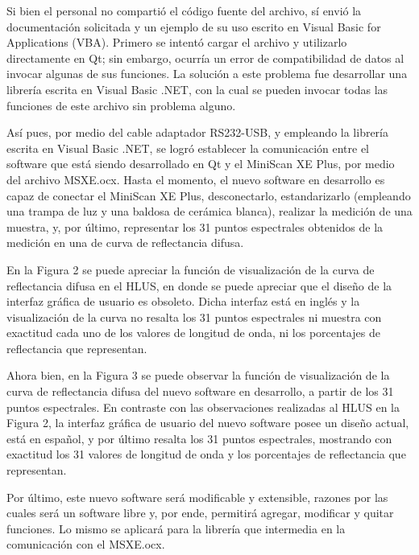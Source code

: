 \documentclass[conference]{IEEEtran}
\begin{document}
	Si bien el personal no comparti\'{o} el c\'{o}digo fuente del archivo, s\'{i} envi\'{o} la documentaci\'{o}n solicitada y un ejemplo de su uso escrito en Visual Basic for Applications (VBA). Primero se intent\'{o} cargar el archivo y utilizarlo directamente en Qt; sin embargo, ocurr\'{i}a un error de compatibilidad de datos al invocar algunas de sus funciones. La soluci\'{o}n a este problema fue desarrollar una librer\'{i}a escrita en Visual Basic .NET, con la cual se pueden invocar todas las funciones de este archivo sin problema alguno.

	As\'{i} pues, por medio del cable adaptador RS232-USB, y empleando la librer\'{i}a escrita en Visual Basic .NET, se logr\'{o} establecer la comunicaci\'{o}n entre el software que est\'{a} siendo desarrollado en Qt y el MiniScan XE Plus, por medio del archivo MSXE.ocx. Hasta el momento, el nuevo software en desarrollo es capaz de conectar el MiniScan XE Plus, desconectarlo, estandarizarlo (empleando una trampa de luz y una baldosa de cer\'{a}mica blanca), realizar la medici\'{o}n de una muestra, y, por \'{u}ltimo, representar los 31 puntos espectrales obtenidos de la medici\'{o}n en una de curva de reflectancia difusa.
	
	En la Figura 2 se puede apreciar la funci\'{o}n de visualizaci\'{o}n de la curva de reflectancia difusa en el HLUS, en donde se puede apreciar que el dise\~{n}o de la interfaz gr\'{a}fica de usuario es obsoleto. Dicha interfaz est\'{a} en ingl\'{e}s y la visualizaci\'{o}n de la curva no resalta los 31 puntos espectrales ni muestra con exactitud cada uno de los valores de longitud de onda, ni los porcentajes de reflectancia que representan.
	
	Ahora bien, en la Figura 3 se puede observar la funci\'{o}n de visualizaci\'{o}n de la curva de reflectancia difusa del nuevo software en desarrollo, a partir de los 31 puntos espectrales. En contraste con las observaciones realizadas al HLUS en la Figura 2, la interfaz gr\'{a}fica de usuario del nuevo software posee un dise\~{n}o actual, est\'{a} en espa\~{n}ol, y por \'{u}ltimo resalta los 31 puntos espectrales, mostrando con exactitud los 31 valores de longitud de onda y los porcentajes de reflectancia que representan.
	
	Por \'{u}ltimo, este nuevo software ser\'{a} modificable y extensible, razones por las cuales ser\'{a} un software libre y, por ende, permitir\'{a} agregar, modificar y quitar funciones. Lo mismo se aplicar\'{a} para la librer\'{i}a que intermedia en la comunicaci\'{o}n con el MSXE.ocx.
	
\end{document}
